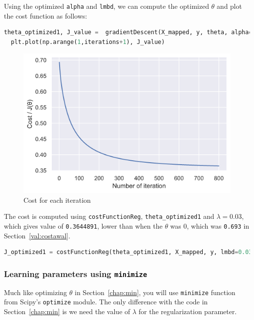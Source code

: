 \documentclass[12pt]{article}
\begin{document}
Using the optimized \texttt{alpha} and \texttt{lmbd}, we can compute the optimized $\theta$ and plot the cost function as follows:

\begin{lstlisting}[language=Python]
  theta_optimized1, J_value =  gradientDescent(X_mapped, y, theta, alpha=1, iterations=iterations, lmbd=0.03)
  plt.plot(np.arange(1,iterations+1), J_value)
\end{lstlisting}

\begin{figure}[h!]
  \centering
  \includegraphics[scale=0.6]{gradientdescent2.png}
  \caption{Cost for each iteration}
  \label{fig:graddescent2}
\end{figure}

The cost is computed using \texttt{costFunctionReg}, \verb|theta_optimized1| and $\lambda = 0.03$, which gives value of \texttt{0.3644891}, lower than when the $\theta$ was 0, which was \texttt{0.693} in Section~\ref{val:costawal}.



\begin{lstlisting}[language=Python]
  J_optimized1 = costFunctionReg(theta_optimized1, X_mapped, y, lmbd=0.03)
\end{lstlisting}

\subsubsection{Learning parameters using \texttt{minimize}}

Much like optimizing $\theta$ in Section~\ref{chap:min}, you will use \texttt{minimize} function from Scipy's \texttt{optimize} module. The only difference with the code in Section~\ref{chap:min} is we need the value of $\lambda$ for the regularization parameter. 
\end{document}
